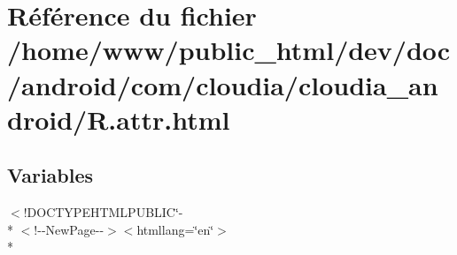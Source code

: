 \hypertarget{_r_8attr_8html}{\section{Référence du fichier /home/www/public\-\_\-html/dev/doc/android/com/cloudia/cloudia\-\_\-android/\-R.attr.\-html}
\label{_r_8attr_8html}
}
\subsection*{Variables}
\begin{DoxyCompactItemize}
\item 
$<$!D\-O\-C\-T\-Y\-P\-E\-H\-T\-M\-L\-P\-U\-B\-L\-I\-C\char`\"{}-\/\\*
$<$!-\/-\/New\-Page-\/-\/$>$$<$htmllang=\char`\"{}en\char`\"{}$>$\\*
$$
\end{DoxyCompactItemize}
